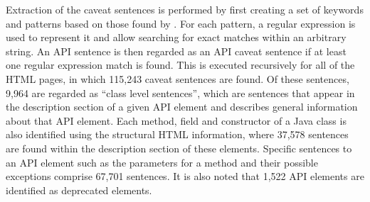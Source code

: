 Extraction of the caveat sentences is performed by first creating a set of keywords and patterns based on those found by \cite{caveat-knowledge-graph}. For each pattern, a regular expression is used to represent it and allow searching for exact matches within an arbitrary string. An API sentence is then regarded as an API caveat sentence if at least one regular expression match is found. This is executed recursively for all of the HTML pages, in which 115,243 caveat sentences are found. Of these sentences, 9,964 are regarded as ``class level sentences'', which are sentences that appear in the description section of a given API element and describes general information about that API element. Each method, field and constructor of a Java class is also identified using the structural HTML information, where 37,578 sentences are found within the description section of these elements. Specific sentences to an API element such as the parameters for a method and their possible exceptions comprise 67,701 sentences. It is also noted that 1,522 API elements are identified as deprecated elements. \\

